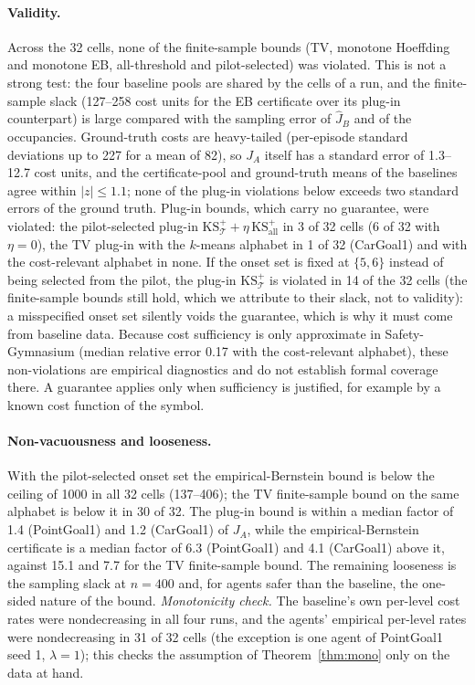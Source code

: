 \documentclass{article}
\begin{document}
\paragraph{Validity.} Across the 32 cells, none of the finite-sample bounds (TV, monotone Hoeffding and monotone EB, all-threshold and pilot-selected) was violated. This is not a strong test: the four baseline pools are shared by the cells of a run, and the finite-sample slack (127--258 cost units for the EB certificate over its plug-in counterpart) is large compared with the sampling error of $\hat J_B$ and of the occupancies. Ground-truth costs are heavy-tailed (per-episode standard deviations up to 227 for a mean of 82), so $J_A$ itself has a standard error of 1.3--12.7 cost units, and the certificate-pool and ground-truth means of the baselines agree within $|z|\le1.1$; none of the plug-in violations below exceeds two standard errors of the ground truth. Plug-in bounds, which carry no guarantee, were violated: the pilot-selected plug-in $\mathrm{KS}^+_{\mathcal T}+\eta\,\mathrm{KS}^+_{\mathrm{all}}$ in 3 of 32 cells (6 of 32 with $\eta=0$), the TV plug-in with the $k$-means alphabet in 1 of 32 (CarGoal1) and with the cost-relevant alphabet in none. If the onset set is fixed at $\{5,6\}$ instead of being selected from the pilot, the plug-in $\mathrm{KS}^+_{\mathcal T}$ is violated in 14 of the 32 cells (the finite-sample bounds still hold, which we attribute to their slack, not to validity): a misspecified onset set silently voids the guarantee, which is why it must come from baseline data. Because cost sufficiency is only approximate in Safety-Gymnasium (median relative error 0.17 with the cost-relevant alphabet), these non-violations are empirical diagnostics and do not establish formal coverage there. A guarantee applies only when sufficiency is justified, for example by a known cost function of the symbol.

\paragraph{Non-vacuousness and looseness.} With the pilot-selected onset set the empirical-Bernstein bound is below the ceiling of 1000 in all 32 cells (137--406); the TV finite-sample bound on the same alphabet is below it in 30 of 32. The plug-in bound is within a median factor of 1.4 (PointGoal1) and 1.2 (CarGoal1) of $J_A$, while the empirical-Bernstein certificate is a median factor of 6.3 (PointGoal1) and 4.1 (CarGoal1) above it, against 15.1 and 7.7 for the TV finite-sample bound. The remaining looseness is the sampling slack at $n=400$ and, for agents safer than the baseline, the one-sided nature of the bound. \emph{Monotonicity check.} The baseline's own per-level cost rates were nondecreasing in all four runs, and the agents' empirical per-level rates were nondecreasing in 31 of 32 cells (the exception is one agent of PointGoal1 seed 1, $\lambda=1$); this checks the assumption of Theorem~\ref{thm:mono} only on the data at hand.
\end{document}
